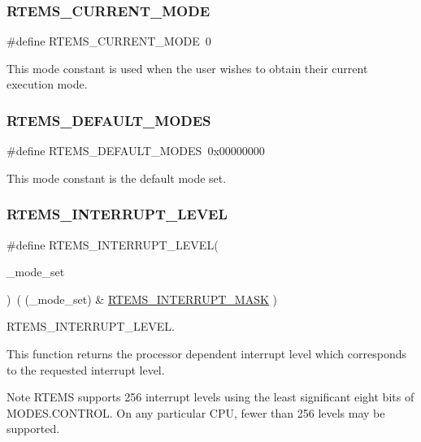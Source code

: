\subsubsection{\texorpdfstring{RTEMS\_CURRENT\_MODE}{RTEMS\_CURRENT\_MODE}}
{\footnotesize\ttfamily \#define R\+T\+E\+M\+S\+\_\+\+C\+U\+R\+R\+E\+N\+T\+\_\+\+M\+O\+DE~0}

This mode constant is used when the user wishes to obtain their current execution mode. \mbox{\label{group__ClassicModes_ga809c838116a3079c58fb6e41d7f1782a}} 
\subsubsection{\texorpdfstring{RTEMS\_DEFAULT\_MODES}{RTEMS\_DEFAULT\_MODES}}
{\footnotesize\ttfamily \#define R\+T\+E\+M\+S\+\_\+\+D\+E\+F\+A\+U\+L\+T\+\_\+\+M\+O\+D\+ES~0x00000000}

This mode constant is the default mode set. \mbox{\label{group__ClassicModes_ga39a1f6143434df1c0bae66cbb083de94}} 
\subsubsection{\texorpdfstring{RTEMS\_INTERRUPT\_LEVEL}{RTEMS\_INTERRUPT\_LEVEL}}
{\footnotesize\ttfamily \#define R\+T\+E\+M\+S\+\_\+\+I\+N\+T\+E\+R\+R\+U\+P\+T\+\_\+\+L\+E\+V\+EL(\begin{DoxyParamCaption}\item[{}]{\+\_\+mode\+\_\+set }\end{DoxyParamCaption})~( (\+\_\+mode\+\_\+set) \& \mbox{\hyperlink{group__ClassicModes_gaebcf8a52ba62835e741e5325a537a9af}{R\+T\+E\+M\+S\+\_\+\+I\+N\+T\+E\+R\+R\+U\+P\+T\+\_\+\+M\+A\+SK}} )}



R\+T\+E\+M\+S\+\_\+\+I\+N\+T\+E\+R\+R\+U\+P\+T\+\_\+\+L\+E\+V\+EL. 

This function returns the processor dependent interrupt level which corresponds to the requested interrupt level.

\begin{DoxyNote}{Note}
R\+T\+E\+MS supports 256 interrupt levels using the least significant eight bits of M\+O\+D\+E\+S.\+C\+O\+N\+T\+R\+OL. On any particular C\+PU, fewer than 256 levels may be supported. 
\end{DoxyNote}
\mbox{\label{group__ClassicModes_gaebcf8a52ba62835e741e5325a537a9af}} 
